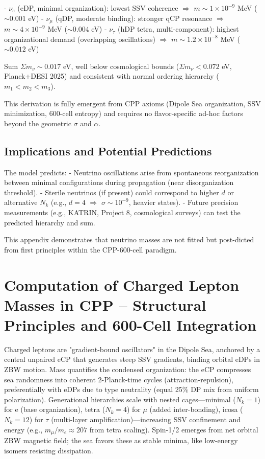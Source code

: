 \documentclass{article}
\begin{document}
- $\nu_e$ (eDP, minimal organization): lowest SSV coherence $\Rightarrow$ $m \sim 1 \times 10^{-9}$ MeV ($\sim 0.001$ eV)
- $\nu_\mu$ (qDP, moderate binding): stronger qCP resonance $\Rightarrow$ $m \sim 4 \times 10^{-9}$ MeV ($\sim 0.004$ eV)
- $\nu_\tau$ (hDP tetra, multi-component): highest organizational demand (overlapping oscillations) $\Rightarrow$ $m \sim 1.2 \times 10^{-8}$ MeV ($\sim 0.012$ eV)

Sum $\Sigma m_\nu \sim 0.017$ eV, well below cosmological bounds ($\Sigma m_\nu < 0.072$ eV, Planck+DESI 2025) and consistent with normal ordering hierarchy ($m_1 < m_2 < m_3$).

This derivation is fully emergent from CPP axioms (Dipole Sea organization, SSV minimization, 600-cell entropy) and requires no flavor-specific ad-hoc factors beyond the geometric $\sigma$ and $\alpha$.

\subsection{Implications and Potential Predictions}

The model predicts:
- Neutrino oscillations arise from spontaneous reorganization between minimal configurations during propagation (near disorganization threshold).
- Sterile neutrinos (if present) could correspond to higher $d$ or alternative $N_k$ (e.g., $d=4$ $\Rightarrow$ $\sigma \sim 10^{-9}$, heavier states).
- Future precision measurements (e.g., KATRIN, Project 8, cosmological surveys) can test the predicted hierarchy and sum.

This appendix demonstrates that neutrino masses are not fitted but post-dicted from first principles within the CPP-600-cell paradigm.

\section{Computation of Charged Lepton Masses in CPP -- Structural Principles and 600-Cell Integration}

Charged leptons are "gradient-bound oscillators" in the Dipole Sea, anchored by a central unpaired eCP that generates steep SSV gradients, binding orbital eDPs in ZBW motion. Mass quantifies the condensed organization: the eCP compresses sea randomness into coherent 2-Planck-time cycles (attraction-repulsion), preferentially with eDPs due to type neutrality (equal 25\% DP mix from uniform polarization). Generational hierarchies scale with nested cages—minimal ($N_k=1$) for e (base organization), tetra ($N_k=4$) for $\mu$ (added inter-bonding), icosa ($N_k=12$) for $\tau$ (multi-layer amplification)—increasing SSV confinement and energy (e.g., $m_\mu / m_e \approx 207$ from tetra scaling). Spin-1/2 emerges from net orbital ZBW magnetic field; the sea favors these as stable minima, like low-energy isomers resisting dissipation.
\end{document}

